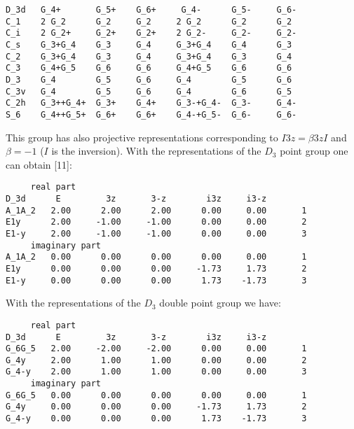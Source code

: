 \documentclass[12pt,a4paper,twoside]{report}
\begin{document}
\begin{tcolorbox}
\begin{footnotesize}
\begin{verbatim}
D_3d   G_4+       G_5+    G_6+     G_4-      G_5-     G_6-
C_1    2 G_2      G_2     G_2     2 G_2      G_2      G_2      
C_i    2 G_2+     G_2+    G_2+    2 G_2-     G_2-     G_2-
C_s    G_3+G_4    G_3     G_4     G_3+G_4    G_4      G_3
C_2    G_3+G_4    G_3     G_4     G_3+G_4    G_3      G_4    
C_3    G_4+G_5    G_6     G_6     G_4+G_5    G_6      G_6
D_3    G_4        G_5     G_6     G_4        G_5      G_6
C_3v   G_4        G_5     G_6     G_4        G_6      G_5
C_2h   G_3++G_4+  G_3+    G_4+    G_3-+G_4-  G_3-     G_4-
S_6    G_4++G_5+  G_6+    G_6+    G_4-+G_5-  G_6-     G_6-
\end{verbatim}
\end{footnotesize}
\end{tcolorbox}

This group has also projective representations corresponding to
$I {3z} = \beta {3z} I$ and $\beta=-1$ ($I$ is the inversion).
With the representations of the $D_3$ point group one can obtain [11]:

\begin{tcolorbox}
\begin{footnotesize}
\begin{verbatim}
     real part
D_3d      E         3z       3-z        i3z     i3-z
A_1A_2   2.00      2.00      2.00      0.00     0.00       1
E1y      2.00     -1.00     -1.00      0.00     0.00       2
E1-y     2.00     -1.00     -1.00      0.00     0.00       3
     imaginary part
A_1A_2   0.00      0.00      0.00      0.00     0.00       1
E1y      0.00      0.00      0.00     -1.73     1.73       2
E1-y     0.00      0.00      0.00      1.73    -1.73       3
\end{verbatim}
\end{footnotesize}
\end{tcolorbox}

With the representations of the $D_3$ double point group we have:

\begin{tcolorbox}
\begin{footnotesize}
\begin{verbatim}
     real part
D_3d      E         3z       3-z        i3z     i3-z
G_6G_5   2.00     -2.00     -2.00      0.00     0.00       1
G_4y     2.00      1.00      1.00      0.00     0.00       2
G_4-y    2.00      1.00      1.00      0.00     0.00       3
     imaginary part
G_6G_5   0.00      0.00      0.00      0.00     0.00       1
G_4y     0.00      0.00      0.00     -1.73     1.73       2
G_4-y    0.00      0.00      0.00      1.73    -1.73       3
\end{verbatim}
\end{footnotesize}
\end{tcolorbox}
\end{document}
